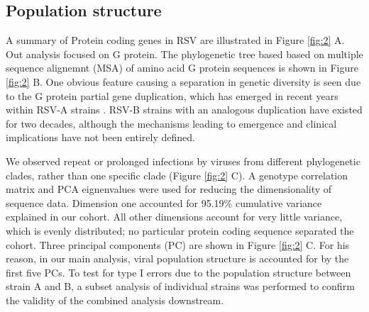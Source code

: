 \documentclass{article} %
\begin{document}
\clearpage	

\subsection{Population structure}
A summary of Protein coding genes in RSV are illustrated in
Figure \ref{fig:2} A.
Out analysis focused on G protein.
The phylogenetic tree based based on multiple sequence alignemnt (MSA) of amino acid G protein sequences is shown in 
Figure \ref{fig:2} B.
One obvious feature causing a separation in genetic diversity is seen due to the G protein partial gene duplication, 
which has emerged in recent years within RSV-A strains 
\cite{eshaghi2012genetic}.
RSV-B strains with an analogous duplication have existed for two decades, 
although the mechanisms leading to emergence and clinical implications have not been entirely defined.

We observed repeat or prolonged infections by viruses from different phylogenetic clades, rather than one specific clade 
(Figure \ref{fig:2} C).
A genotype correlation matrix and PCA eignenvalues were used for reducing the dimensionality of sequence data.
Dimension one accounted for 95.19\% cumulative variance explained in our cohort.
All other dimensions account for very little variance, which is evenly distributed; no particular protein coding sequence separated the cohort.
Three principal components (PC) are shown in Figure \ref{fig:2} C.
For his reason, in our main analysis, viral population structure is accounted for by the first five PCs. 
To test for type I errors due to the population structure between strain A and B, 
a subset analysis of individual strains was performed to confirm the validity of the combined analysis downstream.

\end{document}
